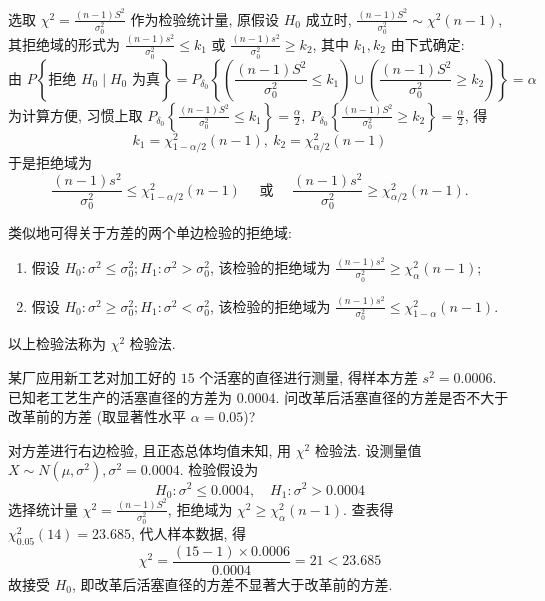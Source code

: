 选取 $\displaystyle \chi^{2}=\frac{(n-1) S^{2}}{\sigma_{0}^{2}} $ 作为检验统计量, 原假设 $ H_{0} $ 成立时, $\displaystyle \frac{(n-1) S^{2}}{\sigma_{0}^{2}} \sim \chi^{2}(n-1)$, 其拒绝域的形式为 $\displaystyle \frac{(n-1) s^{2}}{\sigma_{0}^{2}} \leqslant k_{1} $ 或 $\displaystyle \frac{(n-1) s^{2}}{\sigma_{0}^{2}} \geqslant k_{2} $, 其中 $ k_{1}, k_{2} $ 由下式确定:
$$\text{由 }  P\left\{ \right. \text{拒绝 }  H_{0} \mid H_{0} \left.  \text{ 为真}  \right\}=P_{\delta_{0}}\left\{\left(\frac{(n-1) S^{2}}{\sigma_{0}^{2}} \leqslant k_{1}\right) \cup\left(\frac{(n-1) S^{2}}{\sigma_{0}^{2}} \geqslant k_{2}\right)\right\}=\alpha$$
为计算方便, 习惯上取 $\displaystyle P_{\delta_{0}}\left\{\frac{(n-1) S^{2}}{\sigma_{0}^{2}} \leqslant k_{1}\right\}=\frac{\alpha}{2},~ P_{\delta_0}\left\{\frac{(n-1) S^{2}}{\sigma_{0}^{2}} \geqslant k_{2}\right\}=\frac{\alpha}{2} $, 得 $$ k_{1}=\chi_{1-\alpha / 2}^{2}(n-1) ,~  k_{2}=\chi_{\alpha / 2}^{2}(n-1) $$
于是拒绝域为
$$\frac{(n-1) s^{2}}{\sigma_{0}^{2}} \leqslant \chi_{1-\alpha / 2}^{2}(n-1) \quad \text { 或 } \quad \frac{(n-1) s^{2}}{\sigma_{0}^{2}} \geqslant \chi_{\alpha / 2}^{2}(n-1) .$$

类似地可得关于方差的两个单边检验的拒绝域:

\begin{enumerate}[label=(\arabic{*})]
    \item 假设 $ H_{0}: \sigma^{2} \leqslant \sigma_{0}^{2} ; H_{1}: \sigma^{2}>\sigma_{0}^{2} $, 该检验的拒绝域为 $\displaystyle \frac{(n-1) s^{2}}{\sigma_{0}^{2}} \geqslant \chi_{\alpha}^{2}(n-1) $;
    \item 假设 $ H_{0}: \sigma^{2} \geqslant \sigma_{0}^{2} ; H_{1}: \sigma^{2}<\sigma_{0}^{2} $, 该检验的拒绝域为 $\displaystyle \frac{(n-1) s^{2}}{\sigma_{0}^{2}} \leqslant \chi_{1-\alpha}^{2}(n-1) $.
\end{enumerate}
以上检验法称为 $ \chi^{2} $ 检验法.

\begin{example}
    某厂应用新工艺对加工好的 $15 $ 个活塞的直径进行测量, 得样本方差 $ s^{2}=  0.0006$. 
    已知老工艺生产的活塞直径的方差为 $0.0004$. 问改革后活塞直径的方差是否不大于改革前的方差 (取显著性水平 $ \alpha=0.05$)?
\end{example}
\begin{solution}
    对方差进行右边检验, 且正态总体均值未知, 用 $ \chi^{2} $ 检验法. 
    设测量值 $ X \sim N\left(\mu, \sigma^{2}\right), \sigma^{2}=0.0004 $.
    检验假设为
    $$H_{0}: \sigma^{2} \leqslant 0.0004, \quad H_{1}: \sigma^{2}>0.0004 $$
    选择统计量 $\displaystyle \chi^{2}=\frac{(n-1) S^{2}}{\sigma_{0}^{2}} $, 拒绝域为 $ \chi^{2} \geqslant \chi_{\alpha}^{2}(n-1) $. 
    查表得 $ \chi_{0.05}^{2}(14)=23.685$, 代人样本数据, 得 $$\displaystyle \chi^{2}=\frac{(15-1) \times 0.0006}{0.0004}=21<23.685 $$ 
    故接受 $ H_{0} $, 即改革后活塞直径的方差不显著大于改革前的方差.
\end{solution}

